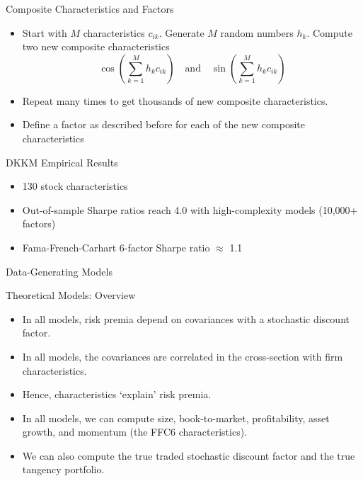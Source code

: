 \documentclass[aspectratio=169]{beamer}
\begin{document}
\begin{frame}{Composite Characteristics and Factors}
\begin{itemize}
  \item Start with $M$ characteristics $c_{ik}$.  Generate $M$ random numbers $h_k$.  Compute two new composite characteristics
$$\cos\left(\sum_{k=1}^M h_kc_{ik}\right) \quad \text{and} \quad \sin\left(\sum_{k=1}^M h_kc_{ik}\right)$$
  \item Repeat many times to get thousands of new composite characteristics.
  \item Define a factor as described before for each of the new composite characteristics
\end{itemize}
\end{frame}

\begin{frame}{DKKM Empirical Results}
\begin{itemize}
  \item 130 stock characteristics
  \item Out-of-sample Sharpe ratios reach 4.0 with high-complexity models (10,000+ factors)
   \item Fama-French-Carhart 6-factor Sharpe ratio $\approx$ 1.1
 \end{itemize}
\end{frame}

\begin{frame}[c]
  \centering
  \Huge Data-Generating Models
\end{frame}

\begin{frame}{Theoretical Models: Overview}
\begin{itemize}
\item In all models, risk premia depend on covariances with a stochastic discount factor.
\item In all models, the covariances are correlated in the cross-section with firm characteristics.
\item Hence, characteristics `explain' risk premia.
\item In all models, we can compute size, book-to-market, profitability, asset growth, and momentum (the FFC6 characteristics).
\item We can also compute the true \alert{traded} stochastic discount factor and the true tangency portfolio.
\end{itemize}
\end{frame}
\end{document}
